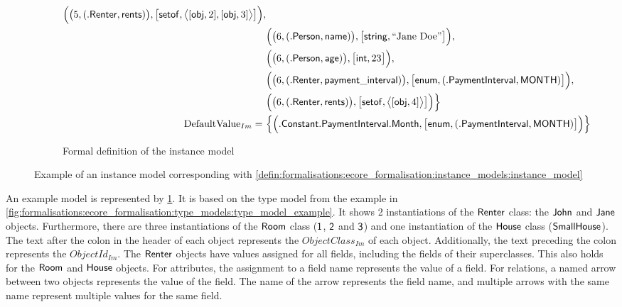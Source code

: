 \begin{figure}[p]
\begin{subfigure}{\textwidth}
\begin{align*}
                \Big( \big( 5, ( .\mathsf{Renter}, \mathsf{rents} ) \big), \big[ \mathsf{setof}, \big\langle [ \mathsf{obj}, 2 ], [ \mathsf{obj}, 3 ] \big\rangle \big] \Big),\\&
                \Big( \big( 6, ( .\mathsf{Person}, \mathsf{name} ) \big), \big[ \mathsf{string}, \text{``Jane Doe''} \big] \Big),\\&
                \Big( \big( 6, ( .\mathsf{Person}, \mathsf{age} ) \big), \big[ \mathsf{int}, 23 \big] \Big),\\&
                \Big( \big( 6, ( .\mathsf{Renter}, \mathsf{payment\_interval} ) \big), \big[ \mathsf{enum}, ( .\mathsf{PaymentInterval}, \mathsf{MONTH} ) \big] \Big),\\&
                \Big( \big( 6, ( .\mathsf{Renter}, \mathsf{rents} ) \big), \big[ \mathsf{setof}, \big\langle [ \mathsf{obj}, 4 ] \big\rangle \big] \Big)
            \Big\}\\
            \mathrm{DefaultValue}_{Im} =\ & \Big\{ 
                \Big( .\mathsf{Constant}.\mathsf{PaymentInterval}.\mathsf{Month}, \big[ \mathsf{enum}, ( .\mathsf{PaymentInterval}, \mathsf{MONTH} ) \big] \Big)
            \Big\}
        \end{align*}
        \caption{Formal definition of the instance model}
    \end{subfigure}
    \caption{Example of an instance model corresponding with \cref{defin:formalisations:ecore_formalisation:instance_models:instance_model}}
    \label{fig:formalisations:ecore_formalisation:instance_models:instance_model_example}
\end{figure}

An example model is represented by \cref{fig:formalisations:ecore_formalisation:instance_models:instance_model_example}. It is based on the type model from the example in \cref{fig:formalisations:ecore_formalisation:type_models:type_model_example}.
It shows 2 instantiations of the $\mathsf{Renter}$ class: the $\mathsf{John}$ and $\mathsf{Jane}$ objects. Furthermore, there are three instantiations of the $\mathsf{Room}$ class ($\mathsf{1}$, $\mathsf{2}$ and $\mathsf{3}$) and one instantiation of the $\mathsf{House}$ class ($\mathsf{SmallHouse}$). The text after the colon in the header of each object represents the $ObjectClass_{Im}$ of each object. Additionally, the text preceding the colon represents the $ObjectId_{Im}$. The $\mathsf{Renter}$ objects have values assigned for all fields, including the fields of their superclasses. This also holds for the $\mathsf{Room}$ and $\mathsf{House}$ objects. For attributes, the assignment to a field name represents the value of a field. For relations, a named arrow between two objects represents the value of the field. The name of the arrow represents the field name, and multiple arrows with the same name represent multiple values for the same field.

